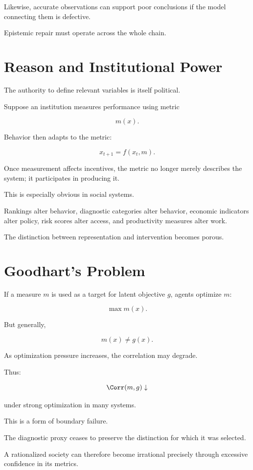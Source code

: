 \documentclass[11pt,oneside]{book}
\theoremstyle{definition}
\theoremstyle{remark}
\begin{document}
Likewise, accurate observations can support poor conclusions if the model connecting them is defective.

Epistemic repair must operate across the whole chain.

\section{Reason and Institutional Power}

The authority to define relevant variables is itself political.

Suppose an institution measures performance using metric

\[
m(x).
\]

Behavior then adapts to the metric:

\[
x_{t+1}
=
f(x_t,m).
\]

Once measurement affects incentives, the metric no longer merely describes the system; it participates in producing it.

This is especially obvious in social systems.

Rankings alter behavior, diagnostic categories alter behavior, economic indicators alter policy, risk scores alter access, and productivity measures alter work.

The distinction between representation and intervention becomes porous.

\section{Goodhart's Problem}

If a measure \(m\) is used as a target for latent objective \(g\), agents optimize \(m\):

\[
\max m(x).
\]

But generally,

\[
m(x)\neq g(x).
\]

As optimization pressure increases, the correlation may degrade.

Thus:

\[
\Corr(m,g)\downarrow
\]

under strong optimization in many systems.

This is a form of boundary failure.

The diagnostic proxy ceases to preserve the distinction for which it was selected.

A rationalized society can therefore become irrational precisely through excessive confidence in its metrics.
\end{document}
